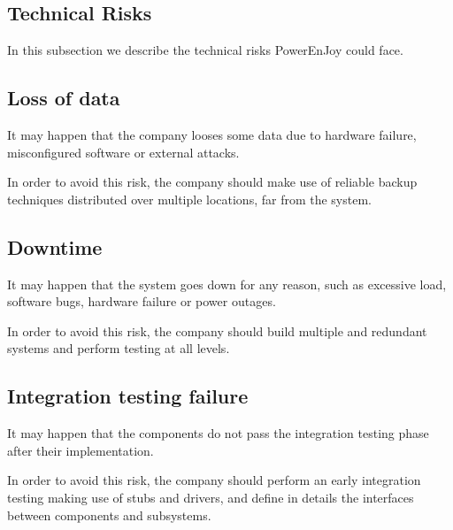 \subsection{Technical Risks}
In this subsection we describe the technical risks PowerEnJoy could face.

\subsection*{Loss of data}
It may happen that the company looses some data due to hardware failure, misconfigured software or external attacks. 

In order to avoid this risk, the company should make use of reliable backup techniques distributed over multiple locations, far from the system.

\subsection*{Downtime}
It may happen that the system goes down for any reason, such as excessive load, software bugs, hardware failure or power outages. 

In order to avoid this risk, the company should build multiple and redundant systems and perform testing at all levels.

\subsection*{Integration testing failure}
It may happen that the components do not pass the integration testing phase after their implementation. 

In order to avoid this risk, the company should perform an early integration testing making use of stubs and drivers, and define in details the interfaces between components and subsystems. 